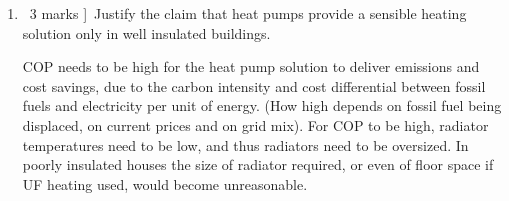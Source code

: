 \documentclass[a4paper,12pt,fleqn]{article}
\begin{document}
\begin{enumerate} [label=\alph*)]
\item \lbrack\ 3 marks ]\ Justify the claim that heat pumps provide a sensible heating solution only in well insulated buildings.\par
COP needs to be high for the heat pump solution to deliver emissions and cost savings, due to the carbon intensity and cost differential between fossil fuels and electricity per unit of energy. (How high depends on fossil fuel being displaced, on current prices and on grid mix). For COP to be high, radiator temperatures need to be low, and thus radiators need to be oversized. In poorly insulated houses the size of radiator required, or even of floor space if UF heating used, would become unreasonable.
\end{enumerate}

\end{document}
